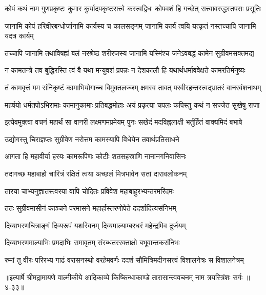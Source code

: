 \twolineshloka
{कोपं कथं नाम गुणप्रकृष्टः कुमार कुर्यादपकृष्टसत्त्वे}
{कस्त्वद्विधः कोपवशं हि गच्छेत् सत्त्वावरुद्धस्तपसः प्रसूतिः} %

\twolineshloka
{जानामि कोपं हरिवीरबन्धोर्जानामि कार्यस्य च कालसङ्गम्}
{जानामि कार्यं त्वयि यत्कृतं नस्तच्चापि जानामि यदत्र कार्यम्} %

\twolineshloka
{तच्चापि जानामि तथाविषह्यं बलं नरश्रेष्ठ शरीरजस्य}
{जानामि यस्मिंश्च जनेऽवबद्धं कामेन सुग्रीवमसक्तमद्य} %

\twolineshloka
{न कामतन्त्रे तव बुद्धिरस्ति त्वं वै यथा मन्युवशं प्रपन्नः}
{न देशकालौ हि यथार्थधर्माववेक्षते कामरतिर्मनुष्यः} %

\twolineshloka
{तं कामवृत्तं मम संनिकृष्टं कामाभियोगाच्च विमुक्तलज्जम्}
{क्षमस्व तावत् परवीरहन्तस्त्वद्भ्रातरं वानरवंशनाथम्} %

\twolineshloka
{महर्षयो धर्मतपोऽभिरामाः कामानुकामाः प्रतिबद्धमोहाः}
{अयं प्रकृत्या चपलः कपिस्तु कथं न सज्जेत सुखेषु राजा} %

\twolineshloka
{इत्येवमुक्त्वा वचनं महार्थं सा वानरी लक्ष्मणमप्रमेयम्}
{पुनः सखेदं मदविह्वलाक्षी भर्तुर्हितं वाक्यमिदं बभाषे} %

\twolineshloka
{उद्योगस्तु चिराज्ञप्तः सुग्रीवेण नरोत्तम}
{कामस्यापि विधेयेन तवार्थप्रतिसाधने} %

\twolineshloka
{आगता हि महावीर्या हरयः कामरूपिणः}
{कोटीः शतसहस्राणि नानानगनिवासिनः} %

\twolineshloka
{तदागच्छ महाबाहो चारित्रं रक्षितं त्वया}
{अच्छलं मित्रभावेन सतां दारावलोकनम्} %

\twolineshloka
{तारया चाभ्यनुज्ञातस्त्वरया वापि चोदितः}
{प्रविवेश महाबाहुरभ्यन्तरमरिंदमः} %

\twolineshloka
{ततः सुग्रीवमासीनं काञ्चने परमासने}
{महार्हास्तरणोपेते ददर्शादित्यसंनिभम्} %

\twolineshloka
{दिव्याभरणचित्राङ्गं दिव्यरूपं यशस्विनम्}
{दिव्यमाल्याम्बरधरं महेन्द्रमिव दुर्जयम्} %

\twolineshloka
{दिव्याभरणमाल्याभिः प्रमदाभिः समावृतम्}
{संरब्धतररक्ताक्षो बभूवान्तकसंनिभः} %

\twolineshloka
{रुमां तु वीरः परिरभ्य गाढं वरासनस्थो वरहेमवर्णः}
{ददर्श सौमित्रिमदीनसत्त्वं विशालनेत्रः स विशालनेत्रम्} %


॥इत्यार्षे श्रीमद्रामायणे वाल्मीकीये आदिकाव्ये किष्किन्धाकाण्डे तारासान्त्ववचनम् नाम त्रयस्त्रिंशः सर्गः ॥४-३३॥
